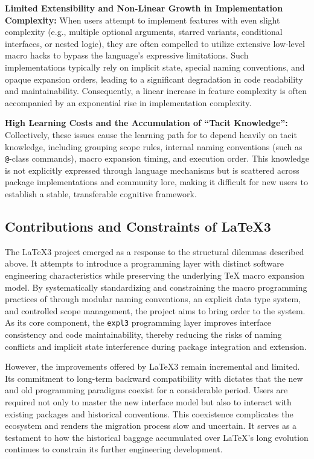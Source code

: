 \textbf{Limited Extensibility and Non-Linear Growth in Implementation Complexity:} When users attempt to implement features with even slight complexity (e.g., multiple optional arguments, starred variants, conditional interfaces, or nested logic), they are often compelled to utilize extensive low-level macro hacks to bypass the language's expressive limitations. Such implementations typically rely on implicit state, special naming conventions, and opaque expansion orders, leading to a significant degradation in code readability and maintainability. Consequently, a linear increase in feature complexity is often accompanied by an exponential rise in implementation complexity.

\textbf{High Learning Costs and the Accumulation of ``Tacit Knowledge'':} Collectively, these issues cause the learning path for \LaTeXe{} to depend heavily on tacit knowledge, including grouping scope rules, internal naming conventions (such as \verb|@|-class commands), macro expansion timing, and execution order. This knowledge is not explicitly expressed through language mechanisms but is scattered across package implementations and community lore, making it difficult for new users to establish a stable, transferable cognitive framework.

\subsection{Contributions and Constraints of \LaTeX3}

The \LaTeX3 project emerged as a response to the structural dilemmas described above. It attempts to introduce a programming layer with distinct software engineering characteristics while preserving the underlying \TeX{} macro expansion model. By systematically standardizing and constraining the macro programming practices of \LaTeXe{} through modular naming conventions, an explicit data type system, and controlled scope management, the project aims to bring order to the system. As its core component, the \texttt{expl3} programming layer improves interface consistency and code maintainability, thereby reducing the risks of naming conflicts and implicit state interference during package integration and extension.

However, the improvements offered by \LaTeX3 remain incremental and limited. Its commitment to long-term backward compatibility with \LaTeXe{} dictates that the new and old programming paradigms coexist for a considerable period. Users are required not only to master the new interface model but also to interact with existing packages and historical conventions. This coexistence complicates the ecosystem and renders the migration process slow and uncertain. It serves as a testament to how the historical baggage accumulated over \LaTeX{}'s long evolution continues to constrain its further engineering development.

